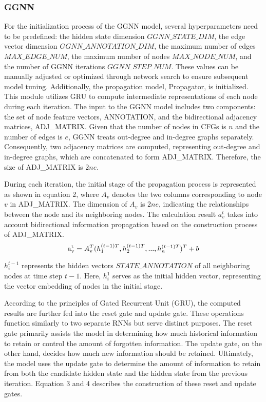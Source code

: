 \documentclass[lineno,sn-mathphys]{sn-jnl}%
\theoremstyle{thmstyleone}%
\theoremstyle{thmstyletwo}%
\theoremstyle{thmstylethree}%
\begin{document}
\subsubsection{GGNN}
For the initialization process of the GGNN model, several hyperparameters need to be predefined: the hidden state dimension \(GGNN\_STATE\_DIM\), the edge vector dimension \(GGNN\_ANNOTATION\_DIM\), the maximum number of edges \(MAX\_EDGE\_NUM\), the maximum number of nodes \(MAX\_NODE\_NUM\), and the number of GGNN iterations \(GGNN\_STEP\_NUM\). These values can be manually adjusted or optimized through network search to ensure subsequent model tuning.
Additionally, the propagation model, Propagator, is initialized. This module utilizes GRU to compute intermediate representations of each node during each iteration.
The input to the GGNN model includes two components: the set of node feature vectors, ANNOTATION, and the bidirectional adjacency matrices, ADJ\_MATRIX. Given that the number of nodes in CFGs is \(n\) and the number of edges is \(e\), GGNN treats out-degree and in-degree graphs separately. Consequently, two adjacency matrices are computed, representing out-degree and in-degree graphs, which are concatenated to form ADJ\_MATRIX. Therefore, the size of ADJ\_MATRIX is \(2ne\).\par
During each iteration, the initial stage of the propagation process is represented as shown in equation 2, where \(A_v\) denotes the two columns corresponding to node \(v\) in ADJ\_MATRIX. The dimension of \({A_v}\) is \(2ne\), indicating the relationships between the node and its neighboring nodes. The calculation result \(a_v^t\) takes into account bidirectional information propagation based on the construction process of ADJ\_MATRIX.
\begin{equation}
    {\rm{a}}_{\rm{v}}^{\rm{t}} = A_{\rm{v}}^T{(h_1^{(t - 1)T},h_2^{(t - 1)T},...,h_n^{(t - 1)T})^T} + b\label{eq2}
\end{equation}\par
\(h_i^{t - 1}\) represents the hidden vectors \(STATE\_ANNOTATION\) of all neighboring nodes at time step \(t-1\). Here, \(h_i^1\)  serves as the initial hidden vector, representing the vector embedding of nodes in the initial stage.\par
According to the principles of Gated Recurrent Unit (GRU), the computed results are further fed into the reset gate and update gate. These operations function similarly to two separate RNNs but serve distinct purposes. The reset gate primarily assists the model in determining how much historical information to retain or control the amount of forgotten information. The update gate, on the other hand, decides how much new information should be retained. Ultimately, the model uses the update gate to determine the amount of information to retain from both the candidate hidden state and the hidden state from the previous iteration. Equation 3 and 4 describes the construction of these reset and update gates.
\end{document}
